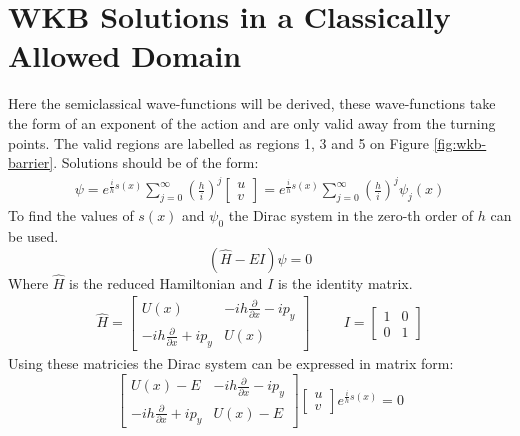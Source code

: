 		\section{WKB Solutions in a Classically Allowed Domain}
		\label{WKB Potential Barrier - WKB Solutions in a Classicaly Allowed Domain}
			Here the semiclassical wave-functions will be derived, these wave-functions take the form of an exponent of the action and are only valid away from the turning points. The valid regions are labelled as regions 1, 3 and 5 on Figure \ref{fig:wkb-barrier}. Solutions should be of the form:
			\begin{align}
				\psi=
				 e^{\frac{i}{h}s\left(x\right)}\sum\limits_{j=0}^\infty\left(\frac{h}{i}\right)^{j}
				\left[\begin{array}{cc}
					u\\
					v
				\end{array}\right]
				= e^{\frac{i}{h}s\left(x\right)}\sum\limits_{j=0}^\infty\left(\frac{h}{i}\right)^{j}\psi_{j}\left(x\right)
			\end{align}
			To find the values of $s\left(x\right)$ and $\psi_{0}$ the Dirac system in the zero-th order of $h$ can be used.
			\begin{equation}
				\left(\hat{H}-EI\right)\psi=0
			\end{equation}
			Where $\hat{H}$ is the reduced Hamiltonian and $I$ is the identity matrix.
			\begin{align}
				\hat{H}=
				\left[\begin{array}{cc}
					U\left(x\right)&-ih\frac{\partial}{\partial x}-ip_{y}\\
					-ih\frac{\partial}{\partial x}+ip_{y}&U\left(x\right)
				\end{array}\right]
				\hspace{1cm}
				I=
				\left[\begin{array}{cc}
					1&0\\
					0&1
				\end{array}\right]
			\end{align}
			Using these matricies the Dirac system can be expressed in matrix form:
			\begin{equation}
				\left[\begin{array}{cc}
					U\left(x\right)-E&-ih\frac{\partial}{\partial x}-ip_{y}\\
					-ih\frac{\partial}{\partial x}+ip_{y}&U\left(x\right)-E
				\end{array}\right]
				\left[\begin{array}{cc}
					u\\
					v
				\end{array}\right] e^{\frac{i}{h}s\left(x\right)}=0
			\end{equation}

